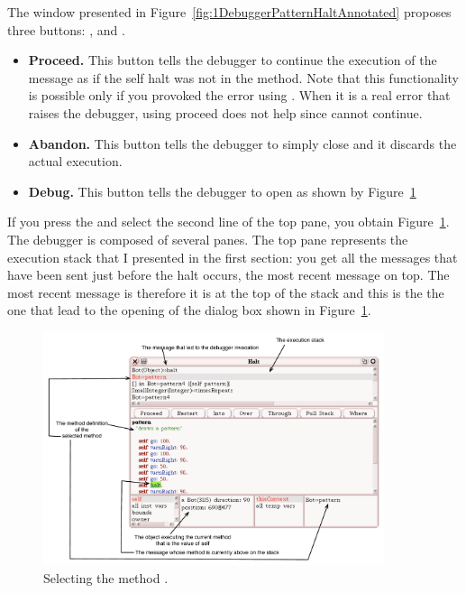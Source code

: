 


The window presented in Figure~\ref{fig:1DebuggerPatternHaltAnnotated} proposes three buttons: ,  and . 
\begin{itemize}
\item \textbf{Proceed.} This button tells the debugger to continue the execution of the message as if the self halt was not in the method. Note that this functionality is possible only if you provoked the error using . When it is a real error that raises the debugger, using proceed does not help since \sq cannot continue. 

\item \textbf{Abandon.} This button tells the debugger to simply close and it discards the actual execution. 

\item \textbf{Debug.} This button tells the debugger to open as shown by Figure~\ref{fig:2DebuggerPatternWithHaltPatternAnnotated}
\end{itemize}

If you press the  and select the second line of the top pane, you obtain Figure~\ref{fig:2DebuggerPatternWithHaltPatternAnnotated}. The debugger is composed of several panes.  The top pane represents the execution stack that I presented in the first section: you get all the messages that have been sent just before the halt occurs, the most recent message on top. The most recent message is  therefore it is at the top of the stack and this is the the one that lead to the opening of the dialog box shown in Figure~\ref{fig:2DebuggerPatternWithHaltPatternAnnotated}.

\begin{figure}[h]
\centerline{\includegraphics[width=10cm]{2DebuggerPatternWithHaltPatternAnnotated}}
\caption{Selecting the method . \label{fig:2DebuggerPatternWithHaltPatternAnnotated}}
\end{figure}

